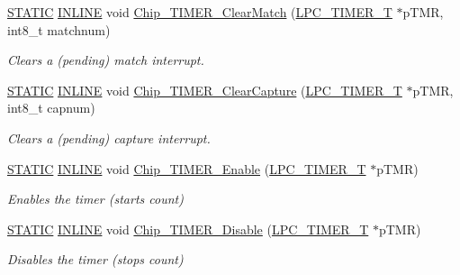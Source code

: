 \begin{DoxyCompactItemize}
\hyperlink{group___l_p_c___types___public___macros_ga10b2d890d871e1489bb02b7e70d9bdfb}{S\+T\+A\+T\+IC} \hyperlink{spifi__18xx__43xx_8h_a2eb6f9e0395b47b8d5e3eeae4fe0c116}{I\+N\+L\+I\+NE} void \hyperlink{group___t_i_m_e_r__18_x_x__43_x_x_gae9ad45169f0511d27696923acfd6a17e}{Chip\+\_\+\+T\+I\+M\+E\+R\+\_\+\+Clear\+Match} (\hyperlink{struct_l_p_c___t_i_m_e_r___t}{L\+P\+C\+\_\+\+T\+I\+M\+E\+R\+\_\+T} $\ast$p\+T\+MR, int8\+\_\+t matchnum)
\begin{DoxyCompactList}\small\item\em Clears a (pending) match interrupt. \end{DoxyCompactList}\item 
\hyperlink{group___l_p_c___types___public___macros_ga10b2d890d871e1489bb02b7e70d9bdfb}{S\+T\+A\+T\+IC} \hyperlink{spifi__18xx__43xx_8h_a2eb6f9e0395b47b8d5e3eeae4fe0c116}{I\+N\+L\+I\+NE} void \hyperlink{group___t_i_m_e_r__18_x_x__43_x_x_ga0aebc9314c86b4e9a67e2d08bab38e24}{Chip\+\_\+\+T\+I\+M\+E\+R\+\_\+\+Clear\+Capture} (\hyperlink{struct_l_p_c___t_i_m_e_r___t}{L\+P\+C\+\_\+\+T\+I\+M\+E\+R\+\_\+T} $\ast$p\+T\+MR, int8\+\_\+t capnum)
\begin{DoxyCompactList}\small\item\em Clears a (pending) capture interrupt. \end{DoxyCompactList}\item 
\hyperlink{group___l_p_c___types___public___macros_ga10b2d890d871e1489bb02b7e70d9bdfb}{S\+T\+A\+T\+IC} \hyperlink{spifi__18xx__43xx_8h_a2eb6f9e0395b47b8d5e3eeae4fe0c116}{I\+N\+L\+I\+NE} void \hyperlink{group___t_i_m_e_r__18_x_x__43_x_x_gaff500707a8a397daf29cc84f454802b2}{Chip\+\_\+\+T\+I\+M\+E\+R\+\_\+\+Enable} (\hyperlink{struct_l_p_c___t_i_m_e_r___t}{L\+P\+C\+\_\+\+T\+I\+M\+E\+R\+\_\+T} $\ast$p\+T\+MR)
\begin{DoxyCompactList}\small\item\em Enables the timer (starts count) \end{DoxyCompactList}\item 
\hyperlink{group___l_p_c___types___public___macros_ga10b2d890d871e1489bb02b7e70d9bdfb}{S\+T\+A\+T\+IC} \hyperlink{spifi__18xx__43xx_8h_a2eb6f9e0395b47b8d5e3eeae4fe0c116}{I\+N\+L\+I\+NE} void \hyperlink{group___t_i_m_e_r__18_x_x__43_x_x_gae7fedfd4c2543991eddd7be1b32bd00b}{Chip\+\_\+\+T\+I\+M\+E\+R\+\_\+\+Disable} (\hyperlink{struct_l_p_c___t_i_m_e_r___t}{L\+P\+C\+\_\+\+T\+I\+M\+E\+R\+\_\+T} $\ast$p\+T\+MR)
\begin{DoxyCompactList}\small\item\em Disables the timer (stops count) \end{DoxyCompactList}\item 

\end{DoxyCompactItemize}
